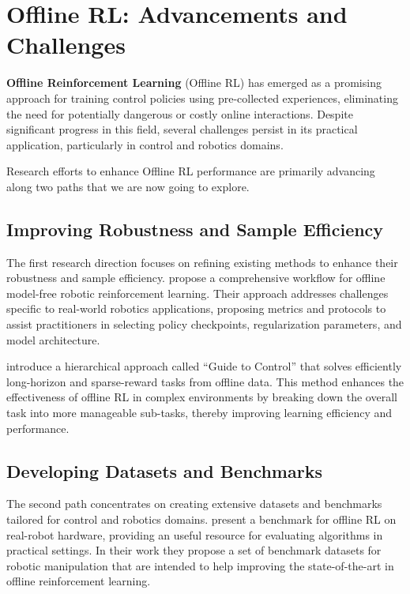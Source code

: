\section{Offline RL: Advancements and Challenges}

\textbf{Offline Reinforcement Learning} (Offline RL)
has emerged as a promising approach for training control
policies using pre-collected experiences,
eliminating the need for potentially dangerous or
costly online interactions. Despite significant progress
in this field, several challenges persist in
its practical application, particularly in control
and robotics domains.

Research efforts to enhance Offline RL performance are
primarily advancing along two paths that we
are now going to explore.

\subsection{Improving Robustness and Sample Efficiency}

The first research direction focuses on refining
existing methods to enhance their robustness and
sample efficiency. \cite{kumar2021} propose a comprehensive
workflow for offline model-free robotic reinforcement
learning. Their approach addresses challenges specific
to real-world robotics applications, proposing
metrics and protocols to assist practitioners in
selecting policy checkpoints, regularization parameters,
and model architecture.

\cite{ijcai2023} introduce a hierarchical approach called
``Guide to Control'' that solves efficiently long-horizon
and sparse-reward tasks from offline data.
This method enhances the effectiveness
of offline RL in complex environments by breaking down the overall
task into more manageable sub-tasks, thereby improving learning
efficiency and performance.

\subsection{Developing Datasets and Benchmarks}

The second path concentrates on creating extensive datasets
and benchmarks tailored for control and robotics domains.
\cite{gurtler2023} present a benchmark for offline RL
on real-robot hardware, providing an useful resource for
evaluating algorithms in practical settings.
In their work they propose a set of
benchmark datasets for robotic manipulation
that are intended to help improving the
state-of-the-art in offline reinforcement learning.

